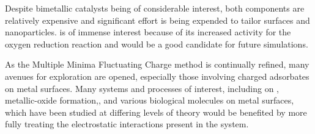 Despite  bimetallic catalysts being of considerable interest,
both components are relatively expensive and significant effort is being
expended to tailor  surfaces and nanoparticles.
 is of immense interest because of its increased activity for
the oxygen reduction reaction and would be a good candidate for future
simulations.\citep{Tuaev:2013fk, Stamenkovic:2007kk,Sneed:2014fj}

As the Multiple Minima Fluctuating Charge method is continually refined, many
avenues for exploration are opened, especially those involving charged
adsorbates on metal surfaces. Many systems and processes of interest, including
 on ,\citep{Xu:2016dz} metallic-oxide
formation,\citep{Streitz:1994mw, Fantauzzi:2014pb, Lloyd:2016jt}, and various
biological molecules on metal surfaces,\citep{Padmos:0qf, Mete:2015rc} which
have been studied at differing levels of theory would be benefited by more
fully treating the electrostatic interactions present in the system. 
